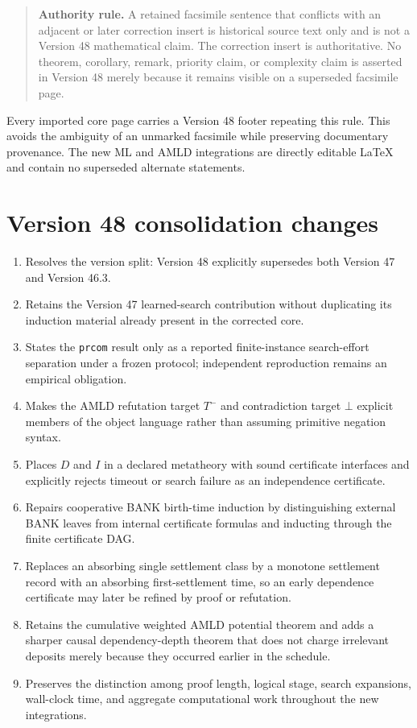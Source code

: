 \documentclass[11pt]{article}
\theoremstyle{remark}
\begin{document}
\begin{quote}
\textbf{Authority rule.} A retained facsimile sentence that conflicts with an adjacent or later correction insert is historical source text only and is not a Version 48 mathematical claim. The correction insert is authoritative. No theorem, corollary, remark, priority claim, or complexity claim is asserted in Version 48 merely because it remains visible on a superseded facsimile page.
\end{quote}

Every imported core page carries a Version 48 footer repeating this rule. This avoids the ambiguity of an unmarked facsimile while preserving documentary provenance. The new ML and AMLD integrations are directly editable LaTeX and contain no superseded alternate statements.

\section*{Version 48 consolidation changes}
\begin{enumerate}[leftmargin=2em]
\item Resolves the version split: Version 48 explicitly supersedes both Version 47 and Version 46.3.
\item Retains the Version 47 learned-search contribution without duplicating its induction material already present in the corrected core.
\item States the \texttt{prcom} result only as a reported finite-instance search-effort separation under a frozen protocol; independent reproduction remains an empirical obligation.
\item Makes the AMLD refutation target $T^-$ and contradiction target $\bot$ explicit members of the object language rather than assuming primitive negation syntax.
\item Places $D$ and $I$ in a declared metatheory with sound certificate interfaces and explicitly rejects timeout or search failure as an independence certificate.
\item Repairs cooperative BANK birth-time induction by distinguishing external BANK leaves from internal certificate formulas and inducting through the finite certificate DAG.
\item Replaces an absorbing single settlement class by a monotone settlement record with an absorbing first-settlement time, so an early dependence certificate may later be refined by proof or refutation.
\item Retains the cumulative weighted AMLD potential theorem and adds a sharper causal dependency-depth theorem that does not charge irrelevant deposits merely because they occurred earlier in the schedule.
\item Preserves the distinction among proof length, logical stage, search expansions, wall-clock time, and aggregate computational work throughout the new integrations.
\end{enumerate}
\end{document}
